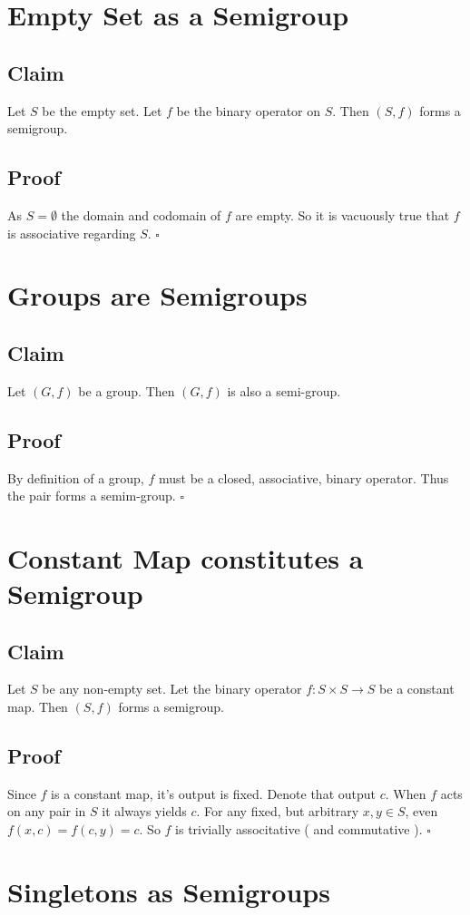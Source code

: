 \documentclass{article}
\begin{document}
\section{Empty Set as a Semigroup}
\subsection{Claim}
Let $S$ be the empty set.
Let $f$ be the binary operator on $S$.
Then $(S,f)$ forms a semigroup.
\subsection{Proof}
As $S = \emptyset$ the domain and codomain of $f$ are empty.
So it is vacuously true that $f$ is associative regarding $S$.
$\square$


\section{Groups are Semigroups}
\subsection{Claim}
Let $(G,f)$ be a group.
Then $(G,f)$ is also a semi-group.
\subsection{Proof}
By definition of a group, $f$ must be a closed, associative, binary operator. Thus the pair forms a semim-group.
$\square$


\section{Constant Map constitutes a Semigroup}
\subsection{Claim}
Let $S$ be any non-empty set.
Let the binary operator $f : S \times S \to S$ be a constant map.
Then $(S,f)$ forms a semigroup.
\subsection{Proof}
Since $f$ is a constant map, it's output is fixed.
Denote that output $c$.
When $f$ acts on any pair in $S$ it always yields $c$.
For any fixed, but arbitrary $x,y \in S$, even $f(x,c) = f(c,y) = c$.
So $f$ is trivially associtative ( and commutative ).
$\square$


\section{Singletons as Semigroups}
\end{document}
